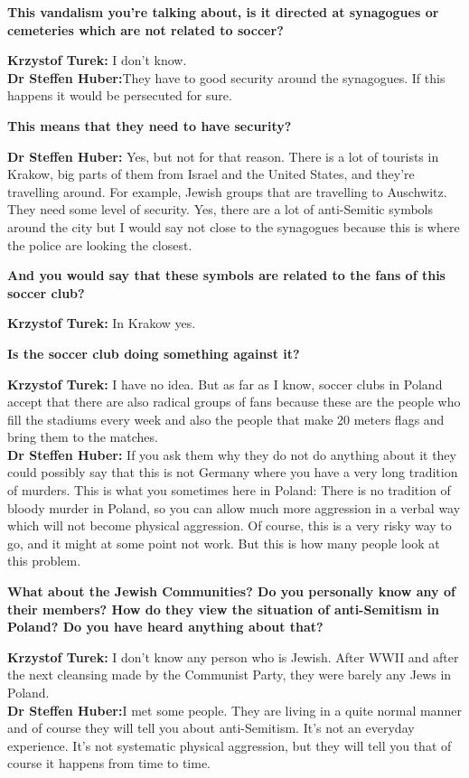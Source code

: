 \textbf{This vandalism you're talking about, is it directed at synagogues or cemeteries which are not related to soccer?} 

\textbf{Krzystof Turek:} I don't know.\\ 
\textbf{Dr Steffen Huber:}They have to good security around the synagogues. If this happens it would be persecuted for sure. 

\textbf{This means that they need to have security?}  

\textbf{Dr Steffen Huber:} Yes, but not for that reason. There is a lot of tourists in Krakow, big parts of them from Israel and the United States, and they're travelling around. For example, Jewish groups that are travelling to Auschwitz. They need some level of security. Yes, there are a lot of anti-Semitic symbols around the city but I would say not close to the synagogues because this is where the police are looking the closest. 

\textbf{And you would say that these symbols are related to the fans of this soccer club?} 

\textbf{Krzystof Turek:} In Krakow yes. 

\textbf{Is the soccer club doing something against it?} 

\textbf{Krzystof Turek:} I have no idea. But as far as I know, soccer clubs in Poland accept that there are also radical groups of fans because these are the people who fill the stadiums every week and also the people that make 20 meters flags and bring them to the matches. \\
\textbf{Dr Steffen Huber:} If you ask them why they do not do anything about it they could possibly say that this is not Germany where you have a very long tradition of murders. This is what you sometimes here in Poland: There is no tradition of bloody murder in Poland, so you can allow much more aggression in a verbal way which will not become physical aggression. Of course, this is a very risky way to go, and it might at some point not work. But this is how many people look at this problem. 

\textbf{What about the Jewish Communities? Do you personally know any of their members? How do they view the situation of anti-Semitism in Poland? Do you have heard anything about that?}  

\textbf{Krzystof Turek:} I don’t know any person who is Jewish. After WWII and after the next cleansing made by the Communist Party, they were barely any Jews in Poland. \\ 
\textbf{Dr Steffen Huber:}I met some people. They are living in a quite normal manner and of course they will tell you about anti-Semitism. It’s not an everyday experience. It's not systematic physical aggression, but they will tell you that of course it happens from time to time. 

